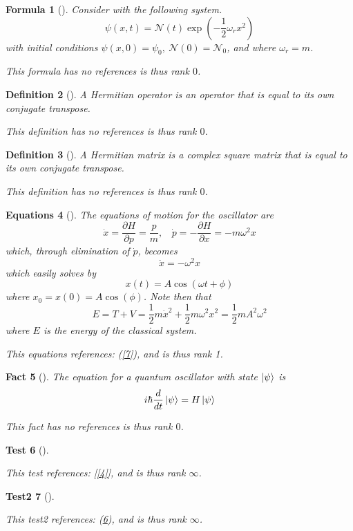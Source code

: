 \documentclass{article}
\newtheorem{definition}{Definition}
\newtheorem{fact}[definition]{Fact}
\newtheorem{formula}[definition]{Formula}
\newtheorem{equations}[definition]{Equations}
\newtheorem{test}[definition]{Test}
\newtheorem{test2}[definition]{Test2}
\begin{document}
\begin{tcolorbox}\begin{formula}[]\label{10}Consider with the following system. 
 $$\psi(x,t)=\mathcal{N}(t)\exp\left(-\frac{1}{2}\omega_r x^2\right)$$
 with initial conditions $\psi(x,0)=\psi_0,~\mathcal{N}(0)=\mathcal{N}_0$, 
 and where $\omega_r=m$.
 
 This formula has no references is thus rank $0$.\end{formula}\end{tcolorbox}
\begin{tcolorbox}\begin{definition}[]\label{11}A Hermitian operator is an operator that is equal 
 to its own conjugate transpose.
 
 This definition has no references is thus rank $0$.\end{definition}\end{tcolorbox}
\begin{tcolorbox}\begin{definition}[]\label{12}A Hermitian matrix is a complex square 
 matrix that is equal to its own conjugate transpose.
 
 This definition has no references is thus rank $0$.\end{definition}\end{tcolorbox}
\begin{tcolorbox}\begin{equations}[]\label{13}The equations of motion for the oscillator are $$\dot{x}=
 \frac{\partial H}{\partial p}=\frac{p}{m},~~~~\dot{p}=-\frac{\partial H}{\partial x}=
 -m\omega^2 x$$ which, through elimination of $\dot{p}$, becomes
 $$\ddot{x}=-\omega^2x$$ which easily solves by
 $$x(t)=A\cos(\omega t+\phi)$$ where $x_0=x(0)=A\cos(\phi)$. Note then that
 $$E=T+V=\frac{1}{2}m\dot{x}^2+\frac{1}{2}m\omega^2x^2=\frac{1}{2}mA^2\omega^2$$
 where $E$ is the energy of the classical system.
 
 This equations references: (\ref{7}), and is thus rank 1.\end{equations}\end{tcolorbox}
\begin{tcolorbox}\begin{fact}[]\label{14}The equation for a quantum oscillator with state $\ket{\psi}$ is
 $$i\hbar\frac{d}{dt}\ket{\psi}=H\ket{\psi}$$
 
 This fact has no references is thus rank $0$.\end{fact}\end{tcolorbox}
\begin{tcolorbox}\begin{test}[]\label{15}
 
 This test references: [\ref{4}], and is thus rank $\infty$.\end{test}\end{tcolorbox}
\begin{tcolorbox}\begin{test2}[]\label{16}
 
 This test2 references: (\ref{15}), and is thus rank $\infty$.\end{test2}\end{tcolorbox}
\end{document}
